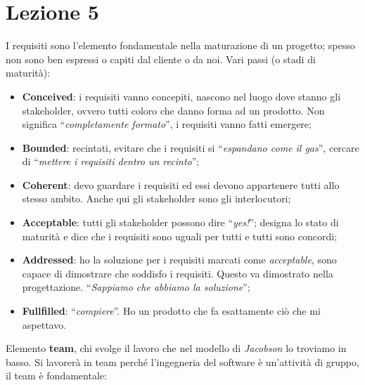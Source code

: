 


\section{Lezione 5}

I requisiti sono l'elemento fondamentale nella maturazione di un progetto; spesso non sono ben espressi o capiti dal cliente o da noi. Vari passi (o stadi di maturità):

\begin{itemize}

	\item \textbf{Conceived}: i requisiti vanno concepiti, nascono nel luogo dove stanno gli stakeholder, ovvero tutti coloro che danno forma ad un prodotto. Non significa ``\textit{completamente formato}'', i requisiti vanno fatti emergere;
	
	\item \textbf{Bounded}: recintati, evitare che i requisiti si ``\textit{espandano come il gas}'', cercare di ``\textit{mettere i requisiti dentro un recinto}'';
	
	\item \textbf{Coherent}: devo guardare i requisiti ed essi devono appartenere tutti allo stesso ambito. Anche qui gli stakeholder sono gli interlocutori;
	
	\item \textbf{Acceptable}: tutti gli stakeholder possono dire ``\textit{yes!}''; designa lo stato di maturità e dice che i requisiti sono uguali per tutti e tutti sono concordi;
	
	\item \textbf{Addressed}: ho la soluzione per i requisiti marcati come \textit{acceptable}, sono capace di dimostrare che soddisfo i requisiti. Questo va dimostrato nella progettazione. ``\textit{Sappiamo che abbiamo la soluzione}'';
	
	\item \textbf{Fullfilled}: ``\textit{compiere}''. Ho un prodotto che fa esattamente ciò che mi aspettavo.

\end{itemize}

Elemento \textbf{team}, chi svolge il lavoro che nel modello di \textit{Jacobson} lo troviamo in basso. Si lavorerà in team perché l'ingegneria del software è un'attività di gruppo, il team è fondamentale:

